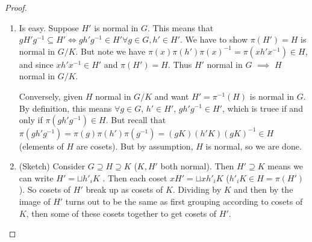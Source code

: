 \documentclass{article}
\theoremstyle{plain}
\theoremstyle{remark}
\begin{document}
\begin{proof}
	\begin{enumerate}
		\item Is easy.
			Suppose $H'$ is normal in $G$.
			This means that $gH'g^{-1} \subseteq H'
			\iff gh'g^{-1} \in H' \forall g\in G, h'\in H'$.
			We have to show $\pi(H') = H$ is normal in $G/K$.
			But note we have $\pi(x)\pi(h')\pi(x)^{-1} = \pi(xh'x^{-1}) \in H$,
			and since $xh'x^{-1} \in H'$ and $\pi(H') = H$.
			Thus $H'$ normal in $G$ $\implies$ $H$ normal in $G/K$.

			Conversely, given $H$ normal in $G/K$ and want $H' = \pi^{-1}(H)$ is normal in $G$.
			By definition, this means $\forall g \in G$, $h' \in H'$, $gh'g^{-1} \in H'$,
			which is truee if and only if $\pi(gh'g^{-1}) \in H$.
			But recall that $\pi(gh'g^{-1}) = \pi(g)\pi(h')\pi(g^{-1})
			= (gK)(h'K)(gK)^{-1} \in H$
			(elements of $H$ are cosets).
			But by assumption, $H$ is normal, so we are done.

		\item (Sketch) Consider $G \supseteq H \supseteq K$
			($K, H'$ both normal).
			Then $H' \supseteq K$ means we can write $H' = \sqcup h'_iK$
.
			Then each coset $xH' = \sqcup xh'_i K$
			($h'_iK \in H = \pi(H')$).
			So cosets of $H'$ break up as cosets of $K$.
			Dividing by $K$ and then by the image of $H'$ turns out to be the same as
			first grouping according to cosets of $K$,
			then some of these cosets together to get cosets of $H'$.
	\end{enumerate}
\end{proof}
\end{document}
